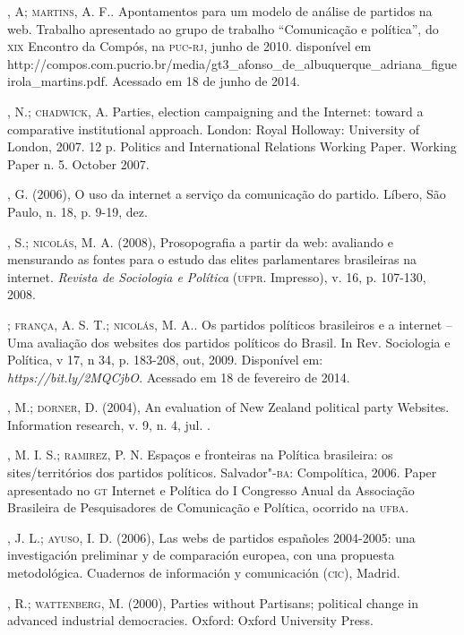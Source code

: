 \begin{bibliohedra}
, A; \textsc{martins}, A. F.. Apontamentos para um modelo de análise
de partidos na web. Trabalho apresentado ao grupo de trabalho
``Comunicação e política'', do \textsc{xix} Encontro da Compós, na \textsc{puc}-\textsc{rj}, junho
de 2010. disponível em
http://compos.com.pucrio.br/media/gt3\_afonso\_de\_albuquerque\_adriana\_figueirola\_martins.pdf.
Acessado em 18 de junho de 2014.

, N.; \textsc{chadwick}, A. Parties, election campaigning and the
Internet: toward a comparative institutional approach. London: Royal
Holloway: University of London, 2007. 12 p. Politics and International
Relations Working Paper. Working Paper n. 5. October 2007.

, G. (2006), O uso da internet a serviço da comunicação do
partido. Líbero, São Paulo, n. 18, p. 9-19, dez.

, S.; \textsc{nicolás}, M. A. (2008), Prosopografia a partir da web:
avaliando e mensurando as fontes para o estudo das elites parlamentares
brasileiras na internet. \emph{Revista de Sociologia e Política} (\textsc{ufpr}.
Impresso), v. 16, p. 107-130, 2008.

\titidem; \textsc{frança}, A. S. T.; \textsc{nicolás}, M. A.. Os partidos políticos
brasileiros e a internet -- Uma avaliação dos websites dos partidos
políticos do Brasil. In Rev. Sociologia e Política, v 17, n 34, p.
183-208, out, 2009. Disponível em:
\emph{https://bit.ly/2MQCjbO}. Acessado em 18 de
fevereiro de 2014.

, M.; \textsc{dorner}, D. (2004), An evaluation of New Zealand political
party Websites. Information research, v. 9, n. 4, jul. .

, M. I. S.; \textsc{ramirez}, P. N. Espaços e fronteiras na Política
brasileira: os sites/territórios dos partidos políticos. Salvador"-\textsc{ba}:
Compolítica, 2006. Paper apresentado no \textsc{gt} Internet e Política do I
Congresso Anual da Associação Brasileira de Pesquisadores de Comunicação
e Política, ocorrido na \textsc{ufba}.

, J. L.; \textsc{ayuso}, I. D. (2006), Las webs de partidos españoles
2004-2005: una investigación preliminar y de comparación europea, con
una propuesta metodológica. Cuadernos de información y comunicación
(\textsc{cic}), Madrid.

, R.; \textsc{wattenberg}, M. (2000), Parties without Partisans; political
change in advanced industrial democracies. Oxford: Oxford University
Press.


\end{bibliohedra}
